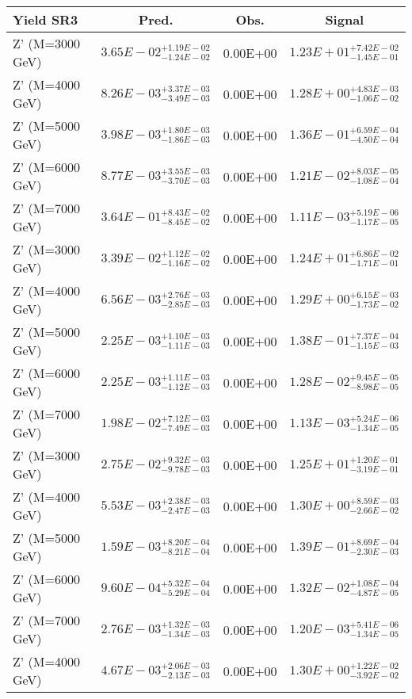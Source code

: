 \documentclass{article}
\begin{document}
 \begin{center}
 \begin{tabular}{ |l|c|c|c| } 
 \hline
 Yield SR3 & Pred. & Obs. & Signal \\
 \hline
 \hline
 Z' (M=3000 GeV) & $3.65E-02^{+1.19E-02}_{-1.24E-02}$ & 0.00E+00 & $1.23E+01^{+7.42E-02}_{-1.45E-01}$ \\
 \hline
 Z' (M=4000 GeV) & $8.26E-03^{+3.37E-03}_{-3.49E-03}$ & 0.00E+00 & $1.28E+00^{+4.83E-03}_{-1.06E-02}$ \\
 \hline
 Z' (M=5000 GeV) & $3.98E-03^{+1.80E-03}_{-1.86E-03}$ & 0.00E+00 & $1.36E-01^{+6.59E-04}_{-4.50E-04}$ \\
 \hline
 Z' (M=6000 GeV) & $8.77E-03^{+3.55E-03}_{-3.70E-03}$ & 0.00E+00 & $1.21E-02^{+8.03E-05}_{-1.08E-04}$ \\
 \hline
 Z' (M=7000 GeV) & $3.64E-01^{+8.43E-02}_{-8.45E-02}$ & 0.00E+00 & $1.11E-03^{+5.19E-06}_{-1.17E-05}$ \\
 \hline
 Z' (M=3000 GeV) & $3.39E-02^{+1.12E-02}_{-1.16E-02}$ & 0.00E+00 & $1.24E+01^{+6.86E-02}_{-1.71E-01}$ \\
 \hline
 Z' (M=4000 GeV) & $6.56E-03^{+2.76E-03}_{-2.85E-03}$ & 0.00E+00 & $1.29E+00^{+6.15E-03}_{-1.73E-02}$ \\
 \hline
 Z' (M=5000 GeV) & $2.25E-03^{+1.10E-03}_{-1.11E-03}$ & 0.00E+00 & $1.38E-01^{+7.37E-04}_{-1.15E-03}$ \\
 \hline
 Z' (M=6000 GeV) & $2.25E-03^{+1.11E-03}_{-1.12E-03}$ & 0.00E+00 & $1.28E-02^{+9.45E-05}_{-8.98E-05}$ \\
 \hline
 Z' (M=7000 GeV) & $1.98E-02^{+7.12E-03}_{-7.49E-03}$ & 0.00E+00 & $1.13E-03^{+5.24E-06}_{-1.34E-05}$ \\
 \hline
 Z' (M=3000 GeV) & $2.75E-02^{+9.32E-03}_{-9.78E-03}$ & 0.00E+00 & $1.25E+01^{+1.20E-01}_{-3.19E-01}$ \\
 \hline
 Z' (M=4000 GeV) & $5.53E-03^{+2.38E-03}_{-2.47E-03}$ & 0.00E+00 & $1.30E+00^{+8.59E-03}_{-2.66E-02}$ \\
 \hline
 Z' (M=5000 GeV) & $1.59E-03^{+8.20E-04}_{-8.21E-04}$ & 0.00E+00 & $1.39E-01^{+8.69E-04}_{-2.30E-03}$ \\
 \hline
 Z' (M=6000 GeV) & $9.60E-04^{+5.32E-04}_{-5.29E-04}$ & 0.00E+00 & $1.32E-02^{+1.08E-04}_{-4.87E-05}$ \\
 \hline
 Z' (M=7000 GeV) & $2.76E-03^{+1.32E-03}_{-1.34E-03}$ & 0.00E+00 & $1.20E-03^{+5.41E-06}_{-1.34E-05}$ \\
 \hline
 Z' (M=4000 GeV) & $4.67E-03^{+2.06E-03}_{-2.13E-03}$ & 0.00E+00 & $1.30E+00^{+1.22E-02}_{-3.92E-02}$ \\

\end{tabular}
\end{center}
\end{document}
